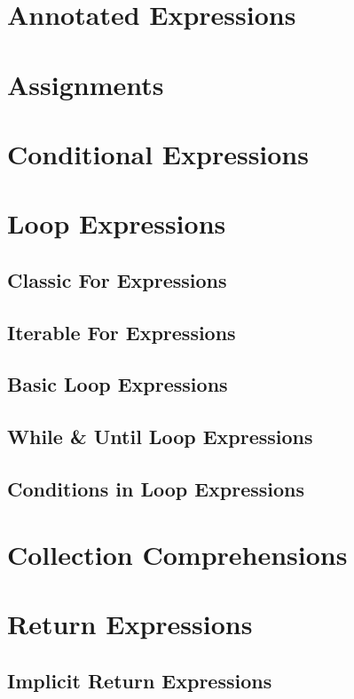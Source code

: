 \section{Annotated Expressions}

\section{Assignments}

\section{Conditional Expressions}

\section{Loop Expressions}

\subsection{Classic For Expressions}

\subsection{Iterable For Expressions}

\subsection{Basic Loop Expressions}

\subsection{While \& Until Loop Expressions}

\subsection{Conditions in Loop Expressions}

\section{Collection Comprehensions}

\section{Return Expressions}

\subsection{Implicit Return Expressions}

